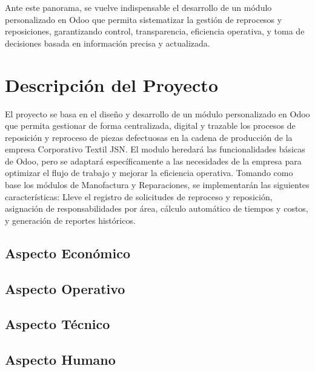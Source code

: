\documentclass[12pt,letterpaper,spanish]{report}
\begin{document}
Ante este panorama, se vuelve indispensable el desarrollo de un módulo personalizado en Odoo que permita sistematizar la gestión de reprocesos y reposiciones, garantizando control, transparencia, eficiencia operativa, y toma de decisiones basada en información precisa y actualizada.



\section{Descripción del Proyecto}

El proyecto se basa en el diseño y desarrollo de un módulo personalizado en Odoo que permita gestionar de forma centralizada, digital y trazable los procesos de reposición y reproceso de piezas defectuosas en la cadena de producción de la empresa Corporativo Textil JSN. El modulo heredará las funcionalidades básicas de Odoo, pero se adaptará específicamente a las necesidades de la empresa para optimizar el flujo de trabajo y mejorar la eficiencia operativa. Tomando como base los módulos de Manofactura y Reparaciones, se implementarán las siguientes características: Lleve el registro de solicitudes de reproceso y reposición, asignación de responsabilidades por área, cálculo automático de tiempos y costos, y generación de reportes históricos.
\subsection*{Aspecto Económico}


\subsection*{Aspecto Operativo}


\subsection*{Aspecto Técnico}


\subsection*{Aspecto Humano}



\end{document}
